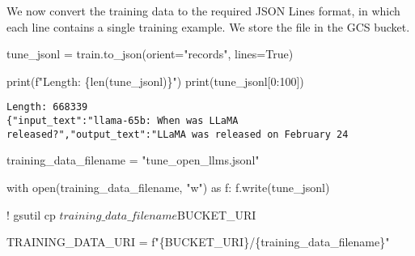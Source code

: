 \documentclass[
  letterpaper,
  DIV=11,
  numbers=noendperiod]{scrreprt}
\newenvironment{Shaded}{\begin{snugshade}}{\end{snugshade}}
\newcommand{\BuiltInTok}[1]{\textcolor[rgb]{0.00,0.23,0.31}{#1}}
\newcommand{\ControlFlowTok}[1]{\textcolor[rgb]{0.00,0.23,0.31}{#1}}
\newcommand{\DecValTok}[1]{\textcolor[rgb]{0.68,0.00,0.00}{#1}}
\newcommand{\ImportTok}[1]{\textcolor[rgb]{0.00,0.46,0.62}{#1}}
\newcommand{\NormalTok}[1]{\textcolor[rgb]{0.00,0.23,0.31}{#1}}
\newcommand{\OperatorTok}[1]{\textcolor[rgb]{0.37,0.37,0.37}{#1}}
\newcommand{\SpecialCharTok}[1]{\textcolor[rgb]{0.37,0.37,0.37}{#1}}
\newcommand{\SpecialStringTok}[1]{\textcolor[rgb]{0.13,0.47,0.30}{#1}}
\newcommand{\StringTok}[1]{\textcolor[rgb]{0.13,0.47,0.30}{#1}}
\newcommand{\VariableTok}[1]{\textcolor[rgb]{0.07,0.07,0.07}{#1}}
\begin{document}
We now convert the training data to the required JSON Lines format, in
which each line contains a single training example. We store the file in
the GCS bucket.

\begin{Shaded}
\begin{Highlighting}[]
\NormalTok{tune\_jsonl }\OperatorTok{=}\NormalTok{ train.to\_json(orient}\OperatorTok{=}\StringTok{"records"}\NormalTok{, lines}\OperatorTok{=}\VariableTok{True}\NormalTok{)}

\BuiltInTok{print}\NormalTok{(}\SpecialStringTok{f"Length: }\SpecialCharTok{\{}\BuiltInTok{len}\NormalTok{(tune\_jsonl)}\SpecialCharTok{\}}\SpecialStringTok{"}\NormalTok{)}
\BuiltInTok{print}\NormalTok{(tune\_jsonl[}\DecValTok{0}\NormalTok{:}\DecValTok{100}\NormalTok{])}
\end{Highlighting}
\end{Shaded}

\begin{verbatim}
Length: 668339
{"input_text":"llama-65b: When was LLaMA released?","output_text":"LLaMA was released on February 24
\end{verbatim}

\begin{Shaded}
\begin{Highlighting}[]
\NormalTok{training\_data\_filename }\OperatorTok{=} \StringTok{"tune\_open\_llms.jsonl"}

\ControlFlowTok{with} \BuiltInTok{open}\NormalTok{(training\_data\_filename, }\StringTok{"w"}\NormalTok{) }\ImportTok{as}\NormalTok{ f:}
\NormalTok{    f.write(tune\_jsonl)}
\end{Highlighting}
\end{Shaded}

\begin{Shaded}
\begin{Highlighting}[]
\OperatorTok{!}\NormalTok{ gsutil cp $training\_data\_filename $BUCKET\_URI}
\end{Highlighting}
\end{Shaded}

\begin{Shaded}
\begin{Highlighting}[]
\NormalTok{TRAINING\_DATA\_URI }\OperatorTok{=} \SpecialStringTok{f"}\SpecialCharTok{\{}\NormalTok{BUCKET\_URI}\SpecialCharTok{\}}\SpecialStringTok{/}\SpecialCharTok{\{}\NormalTok{training\_data\_filename}\SpecialCharTok{\}}\SpecialStringTok{"}
\end{Highlighting}
\end{Shaded}
\end{document}
